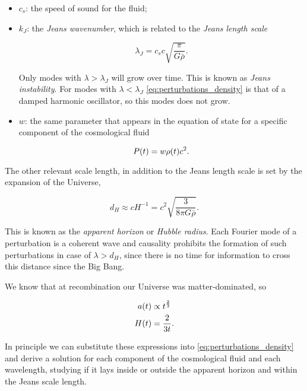 \begin{itemize}
        \item $c_s$: the speed of sound for the fluid;
        \item $k_J$: the \emph{Jeans wavenumber}, which is related to the
        \emph{Jeans length scale}

        \begin{equation}
                \lambda_J = c_s c \sqrt{\frac{\pi}{G \bar \rho}}.
        \end{equation}

        Only modes with $\lambda > \lambda_J$ will grow over time. This is
        known as \emph{Jeans instability}.
        For modes with $\lambda < \lambda_J$
        \autoref{eq:perturbations_density} is that of a damped harmonic
        oscillator, so this modes does not grow.

        \item $w$: the same parameter that appears in the equation of state
        for a specific component of the cosmological fluid

        \begin{equation}
                P\qty(t) = w \rho\qty(t) c^2.
        \end{equation}
\end{itemize}

The other relevant scale length, in addition to the Jeans length scale is
set by the expansion of the Universe,

\begin{equation}
        d_H \approx cH^{-1} = c^2 \sqrt{\frac{3}{8\pi G \bar \rho}}.
\end{equation}

This is known as the \emph{apparent horizon} or \emph{Hubble radius}.
Each Fourier mode of a perturbation
is a coherent wave and causality prohibits the formation of such perturbations
in case of $\lambda > d_H$, since there is no time for information to cross
this distance since the Big Bang.

We know that at recombination our Universe was matter-dominated, so

\begin{align}
        a\qty(t) & \propto t^\frac{2}{3} \\
        H\qty(t) & = \frac{2}{3t}.
\end{align}

In principle we can substitute these expressions into
\autoref{eq:perturbations_density} and derive a solution for each component
of the cosmological fluid and each wavelength, studying if it lays inside
or outside the apparent horizon and within the Jeans scale length.

